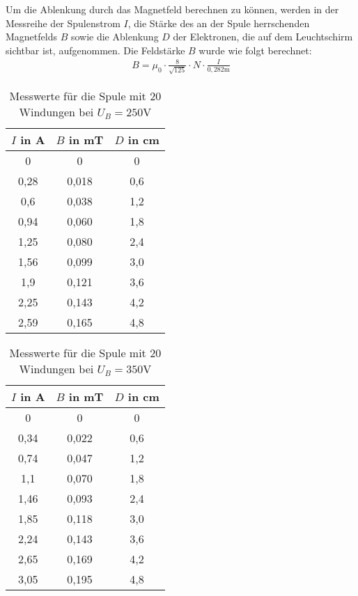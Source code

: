 Um die Ablenkung durch das Magnetfeld berechnen zu können, werden in der Messreihe
der Spulenstrom $I$, die Stärke des an der Spule herrschenden Magnetfelds $B$ sowie die Ablenkung $D$ der Elektronen, die auf dem Leuchtschirm sichtbar ist, aufgenommen.
Die Feldstärke $B$ wurde wie folgt berechnet:
\begin{align*}
  B = \mu_0 \cdot \frac{8}{\sqrt{125}} \cdot N \cdot \frac{I}{0,282 \text{m}}
\end{align*}
\noindent 
\FloatBarrier
\begin{table}
  \centering
  \caption{Messwerte für die Spule mit 20 Windungen bei $U_B = 250$V}
  \label{tab:messwerte3}
  \begin{tabular}{c c c}
  \toprule
   $I$ in A & $B$ in mT & $D$ in cm \\
  \midrule
  0    & 0 & 0 \\
  0,28 & 0,018 & 0,6 \\
  0,6  & 0,038 & 1,2 \\
  0,94 & 0,060 & 1,8 \\
  1,25 & 0,080 & 2,4 \\
  1,56 & 0,099 & 3,0 \\
  1,9  & 0,121 & 3,6 \\
  2,25 & 0,143 & 4,2 \\
  2,59 & 0,165 & 4,8 \\
  \bottomrule
  \bottomrule
\end{tabular}
\end{table}
\noindent 

\FloatBarrier
\begin{table}
  \centering
  \caption{Messwerte für die Spule mit 20 Windungen bei $U_B = 350$V}
  \label{tab:messwerte3}
  \begin{tabular}{c c c}
  \toprule
   $I$ in A & $B$ in mT & $D$ in cm \\
  \midrule
  0    & 0 & 0 \\
  0,34 & 0,022 & 0,6 \\
  0,74  & 0,047 & 1,2 \\
  1,1 & 0,070 & 1,8 \\
  1,46 & 0,093 & 2,4 \\
  1,85 & 0,118 & 3,0 \\
  2,24  & 0,143 & 3,6 \\
  2,65 & 0,169 & 4,2 \\
  3,05 & 0,195 & 4,8 \\
  \bottomrule
  \bottomrule
\end{tabular}
\end{table}


